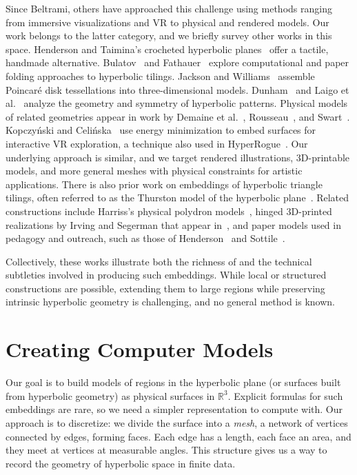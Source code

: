 \documentclass[letterpaper,11pt]{article}
\begin{document}
Since Beltrami, others have approached this challenge using methods ranging from immersive visualizations and VR to physical and rendered models. Our work belongs to the latter category, and we briefly survey other works in this space. Henderson and Taimina's crocheted hyperbolic planes~\cite{henderson2001crocheting} offer a tactile, handmade alternative. Bulatov~\cite{bridges2011:479, bridges2013:167} and Fathauer~\cite{bridges2014:87} explore computational and paper folding approaches to hyperbolic tilings. Jackson and Williams~\cite{bridges2024:619} assemble Poincar\'{e} disk tessellations into three-dimensional models. Dunham~\cite{bridges2007:395} and Laigo et al.~\cite{bridges2008:311} analyze the geometry and symmetry of hyperbolic patterns. Physical models of related geometries appear in work by Demaine et al.~\cite{bridges1999:91}, Rousseau~\cite{bridges2003:127}, and Swart~\cite{bridges2015:151}. Kopczy\'{n}ski and Celi\'{n}ska~\cite{bridges2018:551} use energy minimization to embed surfaces for interactive VR exploration, a technique also used in HyperRogue~\cite{bridges2017:9}. Our underlying approach is similar, and we target rendered illustrations, 3D-printable models, and more general meshes with physical constraints for artistic applications. There is also prior work on embeddings of hyperbolic triangle tilings, often referred to as the Thurston model of the hyperbolic plane~\cite{bennett2010drawing}. Related constructions include Harriss’s physical polydron models~\cite{harriss_polydron}, hinged 3D-printed realizations by Irving and Segerman that appear in~\cite{segerman2016visualizing}, and paper models used in pedagogy and outreach, such as those of Henderson~\cite{hyperbolic_soccerball_iff} and Sottile~\cite{hyperbolic_soccerball_maa}.

Collectively, these works illustrate both the richness of and the technical subtleties involved in producing such embeddings. While local or structured constructions are possible, extending them to large regions while preserving intrinsic hyperbolic geometry is challenging, and no general method is known.


\section*{Creating Computer Models}


Our goal is to build models of regions in the hyperbolic plane (or surfaces built from hyperbolic geometry) as physical surfaces in $\mathbb{R}^3$. Explicit formulas for such embeddings are rare, so we need a simpler representation to compute with. Our approach is to discretize: we divide the surface into a \emph{mesh}, a network of vertices connected by edges, forming faces. Each edge has a length, each face an area, and they meet at vertices at measurable angles. This structure gives us a way to record the geometry of hyperbolic space in finite data.
\end{document}
